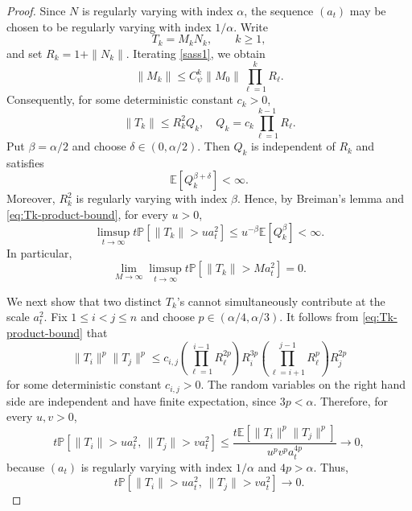 \documentclass[10pt,a4paper]{amsart}
\newcommand{\Ebb}{\mathbb{E}}  %
\newcommand{\Mbf}{{ M}}
\newcommand{\Nbf}{{ N}}
\newcommand{\Pbb}{\mathbb{P}}
\newcommand{\Tbf}{{ T}}
\begin{document}
  \begin{proof}
    Since $\Nbf$ is regularly varying with index $\alpha$, the sequence
    $(a_t)$ may be chosen to be regularly varying with index $1/\alpha$. Write
    \begin{equation*}
      \Tbf_k=\Mbf_k\Nbf_k,
      \qquad k\geq1,
    \end{equation*}
    and set $R_k=1+\|\Nbf_k\|$.
    Iterating \eqref{sass1}, we obtain
    \begin{equation*}
      \|\Mbf_k\|
      \leq C_\psi^k\|\Mbf_0\|
      \prod_{\ell=1}^kR_\ell.
    \end{equation*}
    Consequently, for some deterministic constant $c_k>0$,
    \begin{equation}\label{eq:Tk-product-bound}
      \|\Tbf_k\|
      \leq R_k^2 Q_k, \quad 
      Q_k=c_k\prod_{\ell=1}^{k-1}R_\ell. 
    \end{equation}
    Put $\beta=\alpha/2$ and choose $\delta \in (0,\alpha/2)$.
    Then $Q_k$ is independent of $R_k$ and satisfies
    \begin{equation*}
      \Ebb[Q_k^{\beta+\delta}]<\infty.
    \end{equation*}
    Moreover, $R_k^2$ is regularly varying with index $\beta$. Hence,
    by Breiman's lemma and \eqref{eq:Tk-product-bound}, for every $u>0$,
    \begin{equation*}\label{eq:Tk-tail-bound}
      \limsup_{t\to\infty}
      t\Pbb[\|\Tbf_k\|>u a_t^2]
      \leq u^{-\beta}\Ebb[Q_k^\beta]
      <\infty.
    \end{equation*}
    In particular,
    \begin{equation*}\label{eq:Tk-tail-tightness}
      \lim_{M\to\infty}\limsup_{t\to\infty}
      t\Pbb[\|\Tbf_k\|>M a_t^2]=0.
    \end{equation*}

    We next show that two distinct $\Tbf_k$'s cannot simultaneously contribute
    at the scale $a_t^2$. Fix $1\leq i<j\leq n$ and choose
    $p\in(\alpha/4,\alpha/3)$.    
      It follows from \eqref{eq:Tk-product-bound} that
    \begin{equation*}
      \|\Tbf_i\|^p\|\Tbf_j\|^p
      \leq c_{i,j}
      \left(\prod_{\ell=1}^{i-1}R_\ell^{2p}\right)
      R_i^{3p}
      \left(\prod_{\ell=i+1}^{j-1}R_\ell^p\right)
      R_j^{2p}
    \end{equation*}
    for some deterministic constant $c_{i,j}>0$. 
    The random variables on the right hand side
    are independent and have finite expectation, 
    since $3p<\alpha$. Therefore, for every
    $u,v>0$,
    \begin{equation*}
      t\Pbb\left[
        \|\Tbf_i\|>u a_t^2,\,
        \|\Tbf_j\|>v a_t^2
      \right] 
      \leq
      \frac{
        t\Ebb[\|\Tbf_i\|^p\|\Tbf_j\|^p]
      }{
        u^pv^pa_t^{4p}
      }
      \longrightarrow0,
    \end{equation*}
    because $(a_t)$ is regularly varying with index $1/\alpha$ and
    $4p>\alpha$. Thus,
    \begin{equation*}\label{eq:pairwise-negligibility}
      t\Pbb\left[
        \|\Tbf_i\|>u a_t^2,\,
        \|\Tbf_j\|>v a_t^2
      \right]
      \longrightarrow0.
    \end{equation*}


\end{proof}
\end{document}
